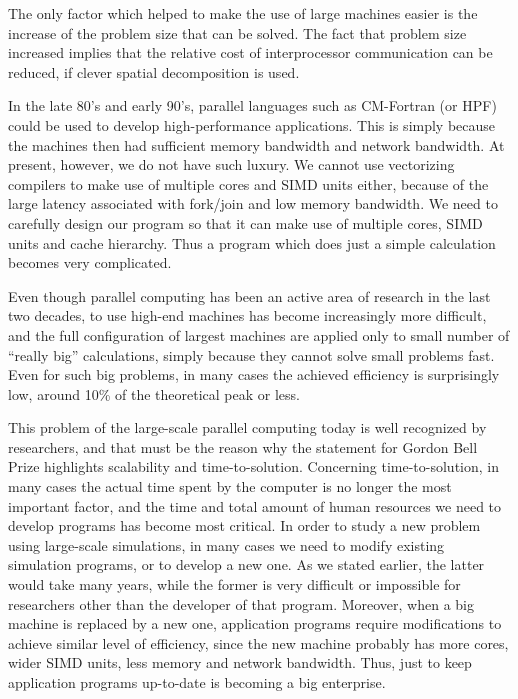 \documentclass[dvipdfmx]{acm_proc_article-sp}
\begin{document}
The only factor which helped to make the use of large machines easier
is the increase of the problem size that can be solved. The fact that
problem size increased implies that the relative cost of
interprocessor communication can be reduced, if clever
spatial decomposition is used.

In the late 80's and early 90's, parallel languages such as CM-Fortran
(or HPF) could be used to develop high-performance applications. This
is simply because the machines then had sufficient memory bandwidth
and network bandwidth. At present, however, we do not have such
luxury.  We cannot use vectorizing compilers to make use of multiple
cores and SIMD units either, because of the large latency associated
with fork/join and low memory bandwidth. We need to carefully design
our program so that it can make use of
multiple cores, SIMD units and cache hierarchy. Thus a program which
does just a simple calculation becomes very complicated.

Even though parallel computing has been an active area of
research in the last two decades, to use high-end machines has become
increasingly more difficult, and the full configuration of largest
machines are applied  only to small number of ``really big''
calculations, simply because they cannot solve small problems
fast. Even for such big problems, in many cases  the achieved efficiency
is surprisingly low, around 10\% of the theoretical peak or less.

This problem of the large-scale parallel computing today is well
recognized by researchers, and that must be the reason why the
statement for Gordon Bell Prize highlights scalability and
time-to-solution. Concerning time-to-solution, in many cases the
actual time spent by the computer is no longer the most important
factor, and the time and total amount of human resources we need to
develop programs has become most critical. In order to study a new
problem using large-scale simulations, in many cases we need to modify
existing simulation programs, or to develop a new one.  As we stated
earlier, the latter would take many years, while the former is very
difficult or impossible for researchers other than the developer of
that program. Moreover, when a big machine is replaced by a new one,
application programs require modifications to achieve similar level of
efficiency, since the new machine probably has more cores, wider SIMD
units, less memory and network bandwidth. Thus, just to keep
application programs up-to-date is becoming a big enterprise.
\end{document}
